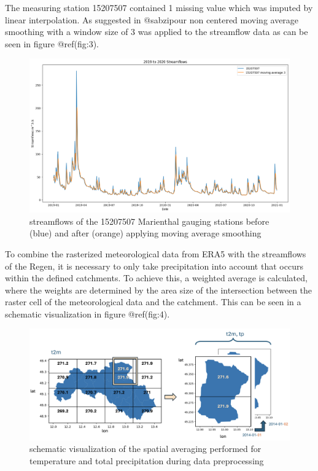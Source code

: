 \documentclass[
]{article}
\begin{document}
The measuring station 15207507 contained 1 missing value which was
imputed by linear interpolation. As suggested in @sabzipour non centered
moving average smoothing with a window size of 3 was applied to the
streamflow data as can be seen in figure @ref(fig:3).

\begin{figure}

{\centering \includegraphics[width=500px]{work/07-hydroLSTM/images/Moving_Average} 

}

\caption{streamflows of the 15207507 Marienthal gauging stations before (blue) and after (orange) applying moving average smoothing}\label{fig:3}
\end{figure}

To combine the rasterized meteorological data from ERA5 with the
streamflows of the Regen, it is necessary to only take precipitation
into account that occurs within the defined catchments. To achieve this,
a weighted average is calculated, where the weights are determined by
the area size of the intersection between the raster cell of the
meteorological data and the catchment. This can be seen in a schematic
visualization in figure @ref(fig:4).

\begin{figure}

{\centering \includegraphics[width=500px]{work/07-hydroLSTM/images/spatial_averaging} 

}

\caption{schematic visualization of the spatial averaging performed for temperature and total precipitation during data preprocessing}\label{fig:4}
\end{figure}
\end{document}
